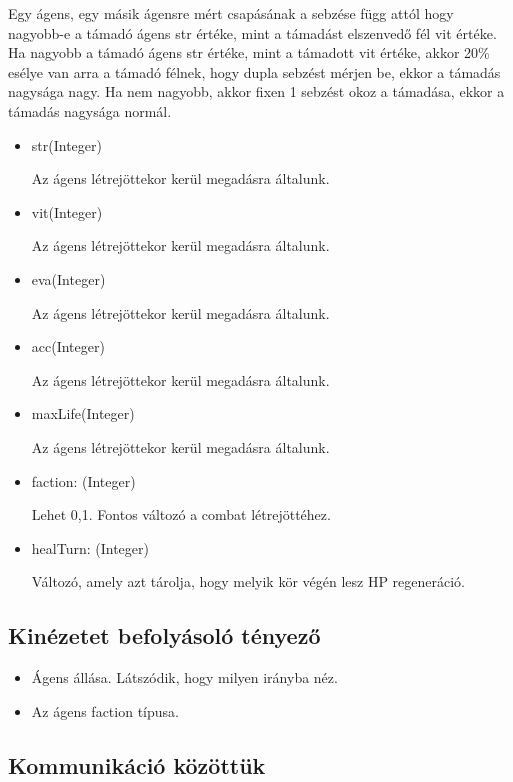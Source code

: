 Egy ágens, egy másik ágensre mért csapásának a sebzése függ attól hogy nagyobb-e a támadó ágens str értéke, mint a támadást elszenvedő fél vit értéke.
Ha nagyobb a támadó ágens str értéke, mint a támadott vit értéke, akkor 20\% esélye van arra a támadó félnek, hogy dupla sebzést mérjen be, ekkor a támadás nagysága nagy.
Ha nem nagyobb, akkor fixen 1 sebzést okoz a támadása, ekkor a támadás nagysága normál.


\begin{itemize}
    
    \item str(Integer)
    
    Az ágens létrejöttekor kerül megadásra általunk.
    \item vit(Integer)
    
    Az ágens létrejöttekor kerül megadásra általunk.
    \item eva(Integer)
    
    Az ágens létrejöttekor kerül megadásra általunk.
    \item acc(Integer)
    
    Az ágens létrejöttekor kerül megadásra általunk.
    \item maxLife(Integer)
    
    Az ágens létrejöttekor kerül megadásra általunk.
    \item faction: (Integer)
    
    Lehet 0,1. Fontos változó a combat létrejöttéhez.
    \item healTurn: (Integer)
    
    Változó, amely azt tárolja, hogy melyik kör végén lesz HP regeneráció.
\end{itemize}

\subsection{Kinézetet befolyásoló tényező}

\begin{itemize}
    \item Ágens állása. Látszódik, hogy milyen irányba néz.
    \item Az ágens faction típusa.
\end{itemize}

\subsection{Kommunikáció közöttük}

